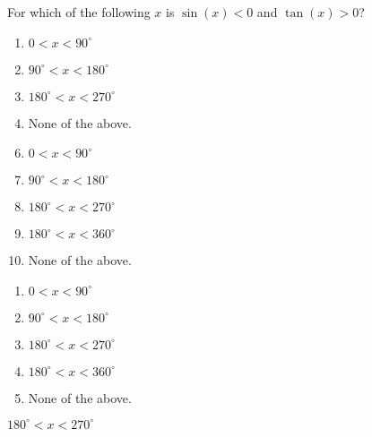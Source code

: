 


  For which of the following $x$ is $\sin(x)<0$ and $\tan(x)>0$? 


\ifsat
	\begin{enumerate}[label=\Alph*)]
		\item   $0<x<90^\circ$
		\item  $90^\circ<x<180^\circ$ 
		\item  $180^\circ<x<270^\circ$ %
		\item  None of the above.
	\end{enumerate}
\else
\fi

\ifacteven
	\begin{enumerate}[label=\textbf{\Alph*.},itemsep=\fill,align=left]
		\setcounter{enumii}{5}
		\item   $0<x<90^\circ$
		\item  $90^\circ<x<180^\circ$ 
		\item  $180^\circ<x<270^\circ$ %
		\addtocounter{enumii}{1}
		\item  $180^\circ<x<360^\circ$
		\item  None of the above.
	\end{enumerate}
\else
\fi

\ifactodd
	\begin{enumerate}[label=\textbf{\Alph*.},itemsep=\fill,align=left]
		\item   $0<x<90^\circ$
		\item  $90^\circ<x<180^\circ$ 
		\item  $180^\circ<x<270^\circ$ %
		\item  $180^\circ<x<360^\circ$
		\item  None of the above.
	\end{enumerate}
\else
\fi

\ifgridin
  $180^\circ<x<270^\circ$ %
		
\else
\fi

